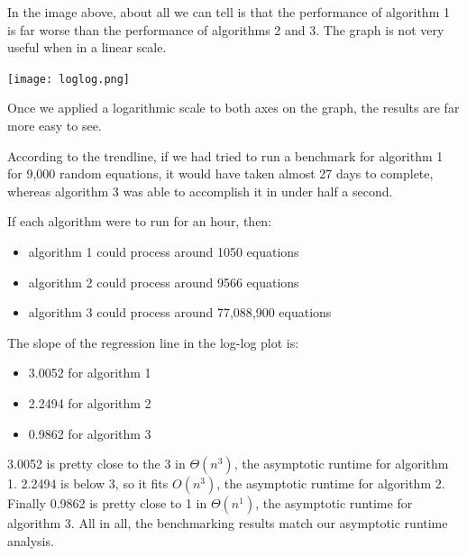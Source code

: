 \documentclass[12pt,letterpaper]{article}
\begin{document}
In the image above, about all we can tell is that the performance of algorithm 1 is far worse than the performance of algorithms 2 and 3. The graph is not very useful when in a linear scale.

\texttt{[image: loglog.png]}

Once we applied a logarithmic scale to both axes on the graph, the results are far more easy to see. 

According to the trendline, if we had tried to run a benchmark for algorithm 1 for 9,000 random equations, it would have taken almost 27 days to complete, whereas algorithm 3 was able to accomplish it in under half a second.

If each algorithm were to run for an hour, then:

\begin{itemize}
	\item algorithm 1 could process around 1050 equations
	\item algorithm 2 could process around 9566 equations
	\item algorithm 3 could process around 77,088,900 equations
\end{itemize}

The slope of the regression line in the log-log plot is:

\begin{itemize}
	\item 3.0052 for algorithm 1
	\item 2.2494 for algorithm 2
	\item 0.9862 for algorithm 3
\end{itemize}

3.0052 is pretty close to the 3 in $\Theta(n^3)$, the asymptotic runtime for algorithm 1. 2.2494 is below 3, so it fits $O(n^3)$, the asymptotic runtime for algorithm 2. Finally 0.9862 is pretty close to 1 in $\Theta(n^1)$, the asymptotic runtime for algorithm 3. All in all, the benchmarking results match our asymptotic runtime analysis.
\end{document}
